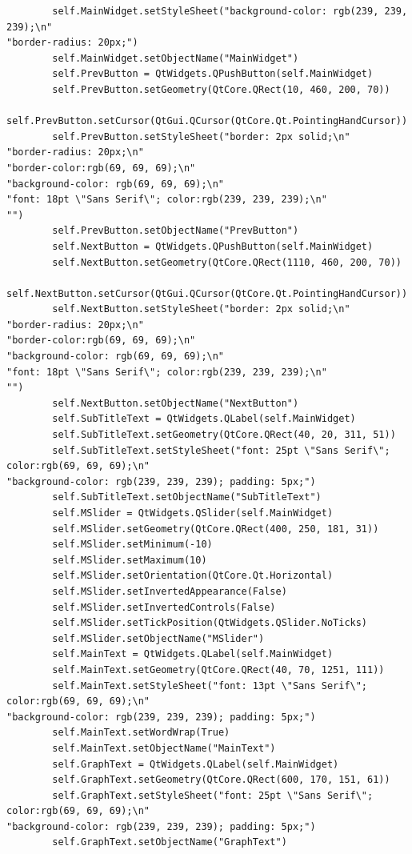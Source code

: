 \documentclass{article}
\begin{document}
\begin{lstlisting}
        self.MainWidget.setStyleSheet("background-color: rgb(239, 239, 239);\n"
"border-radius: 20px;")
        self.MainWidget.setObjectName("MainWidget")
        self.PrevButton = QtWidgets.QPushButton(self.MainWidget)
        self.PrevButton.setGeometry(QtCore.QRect(10, 460, 200, 70))
        self.PrevButton.setCursor(QtGui.QCursor(QtCore.Qt.PointingHandCursor))
        self.PrevButton.setStyleSheet("border: 2px solid;\n"
"border-radius: 20px;\n"
"border-color:rgb(69, 69, 69);\n"
"background-color: rgb(69, 69, 69);\n"
"font: 18pt \"Sans Serif\"; color:rgb(239, 239, 239);\n"
"")
        self.PrevButton.setObjectName("PrevButton")
        self.NextButton = QtWidgets.QPushButton(self.MainWidget)
        self.NextButton.setGeometry(QtCore.QRect(1110, 460, 200, 70))
        self.NextButton.setCursor(QtGui.QCursor(QtCore.Qt.PointingHandCursor))
        self.NextButton.setStyleSheet("border: 2px solid;\n"
"border-radius: 20px;\n"
"border-color:rgb(69, 69, 69);\n"
"background-color: rgb(69, 69, 69);\n"
"font: 18pt \"Sans Serif\"; color:rgb(239, 239, 239);\n"
"")
        self.NextButton.setObjectName("NextButton")
        self.SubTitleText = QtWidgets.QLabel(self.MainWidget)
        self.SubTitleText.setGeometry(QtCore.QRect(40, 20, 311, 51))
        self.SubTitleText.setStyleSheet("font: 25pt \"Sans Serif\"; color:rgb(69, 69, 69);\n"
"background-color: rgb(239, 239, 239); padding: 5px;")
        self.SubTitleText.setObjectName("SubTitleText")
        self.MSlider = QtWidgets.QSlider(self.MainWidget)
        self.MSlider.setGeometry(QtCore.QRect(400, 250, 181, 31))
        self.MSlider.setMinimum(-10)
        self.MSlider.setMaximum(10)
        self.MSlider.setOrientation(QtCore.Qt.Horizontal)
        self.MSlider.setInvertedAppearance(False)
        self.MSlider.setInvertedControls(False)
        self.MSlider.setTickPosition(QtWidgets.QSlider.NoTicks)
        self.MSlider.setObjectName("MSlider")
        self.MainText = QtWidgets.QLabel(self.MainWidget)
        self.MainText.setGeometry(QtCore.QRect(40, 70, 1251, 111))
        self.MainText.setStyleSheet("font: 13pt \"Sans Serif\"; color:rgb(69, 69, 69);\n"
"background-color: rgb(239, 239, 239); padding: 5px;")
        self.MainText.setWordWrap(True)
        self.MainText.setObjectName("MainText")
        self.GraphText = QtWidgets.QLabel(self.MainWidget)
        self.GraphText.setGeometry(QtCore.QRect(600, 170, 151, 61))
        self.GraphText.setStyleSheet("font: 25pt \"Sans Serif\"; color:rgb(69, 69, 69);\n"
"background-color: rgb(239, 239, 239); padding: 5px;")
        self.GraphText.setObjectName("GraphText")

\end{lstlisting}
\end{document}
